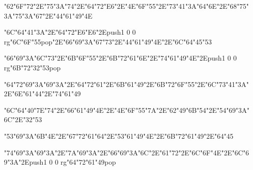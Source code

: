 \centerline{\ipa\char"62\ipa\char"6F\ipa\char"72\ipa\char"2E\ipa\char"75\ipa\char"3A\ipa\char"74\ipa\char"2E\ipa\char"64\ipa\char"72\ipa\char"E6\ipa\char"2E\ipa\char"4E\ipa\char"6F\ipa\char"55\ipa\char"2E\ipa\char"73\ipa\char"41\ipa\char"3A\ipa\char"64\ipa\char"6E\ipa\char"2E\ipa\char"68\ipa\char"75\ipa\char"3A\ipa\char"75\ipa\char"3A\ipa\char"67\ipa\char"2E\ipa\char"44\ipa\char"61\ipa\char"49\ipa\char"4E}\bigskip
\centerline{\ipa\char"6C\ipa\char"64\ipa\char"41\ipa\char"3A\ipa\char"2E\ipa\char"64\ipa\char"72\ipa\char"E6\ipa\char"E6\ipa\char"2E\pdfcolorstack\match push{1 0 0 rg}\ipa\char"6C\ipa\char"6F\ipa\char"55\pdfcolorstack\match pop{}\ipa\char"2E\ipa\char"66\ipa\char"69\ipa\char"3A\ipa\char"67\ipa\char"73\ipa\char"2E\ipa\char"44\ipa\char"61\ipa\char"49\ipa\char"4E\ipa\char"2E\ipa\char"6C\ipa\char"64\ipa\char"45\ipa\char"53}
\vfill\eject
\null\vfill
\centerline{\ipa\char"66\ipa\char"69\ipa\char"3A\ipa\char"6C\ipa\char"73\ipa\char"2E\ipa\char"6B\ipa\char"6F\ipa\char"55\ipa\char"2E\ipa\char"6B\ipa\char"72\ipa\char"61\ipa\char"6E\ipa\char"2E\ipa\char"74\ipa\char"61\ipa\char"49\ipa\char"4E\ipa\char"2E\pdfcolorstack\match push{1 0 0 rg}\ipa\char"6B\ipa\char"72\ipa\char"32\ipa\char"53\pdfcolorstack\match pop{}}\bigskip
\centerline{\ipa\char"64\ipa\char"72\ipa\char"69\ipa\char"3A\ipa\char"69\ipa\char"3A\ipa\char"2E\ipa\char"64\ipa\char"72\ipa\char"61\ipa\char"2E\ipa\char"6B\ipa\char"61\ipa\char"49\ipa\char"2E\ipa\char"6B\ipa\char"72\ipa\char"6F\ipa\char"55\ipa\char"2E\ipa\char"6C\ipa\char"73\ipa\char"41\ipa\char"3A\ipa\char"2E\ipa\char"6E\ipa\char"61\ipa\char"44\ipa\char"2E\ipa\char"74\ipa\char"61\ipa\char"49}\bigskip
\centerline{\ipa\char"6C\ipa\char"64\ipa\char"40\ipa\char"7E\ipa\char"74\ipa\char"2E\ipa\char"66\ipa\char"61\ipa\char"49\ipa\char"4E\ipa\char"2E\ipa\char"4E\ipa\char"6F\ipa\char"55\ipa\char"7A\ipa\char"2E\ipa\char"62\ipa\char"49\ipa\char"6B\ipa\char"54\ipa\char"2E\ipa\char"54\ipa\char"69\ipa\char"3A\ipa\char"6C\ipa\char"2E\ipa\char"32\ipa\char"53}
\vfill\eject
\null\vfill
\centerline{\ipa\char"53\ipa\char"69\ipa\char"3A\ipa\char"6B\ipa\char"4E\ipa\char"2E\ipa\char"67\ipa\char"72\ipa\char"61\ipa\char"64\ipa\char"2E\ipa\char"53\ipa\char"61\ipa\char"49\ipa\char"4E\ipa\char"2E\ipa\char"6B\ipa\char"72\ipa\char"61\ipa\char"49\ipa\char"2E\ipa\char"64\ipa\char"45}\bigskip
\centerline{\ipa\char"74\ipa\char"69\ipa\char"3A\ipa\char"69\ipa\char"3A\ipa\char"2E\ipa\char"7A\ipa\char"69\ipa\char"3A\ipa\char"2E\ipa\char"66\ipa\char"69\ipa\char"3A\ipa\char"6C\ipa\char"2E\ipa\char"61\ipa\char"72\ipa\char"2E\ipa\char"6C\ipa\char"6F\ipa\char"4E\ipa\char"2E\ipa\char"6C\ipa\char"69\ipa\char"3A\ipa\char"2E\pdfcolorstack\match push{1 0 0 rg}\ipa\char"64\ipa\char"72\ipa\char"61\ipa\char"49\pdfcolorstack\match pop{}}\bigskip
